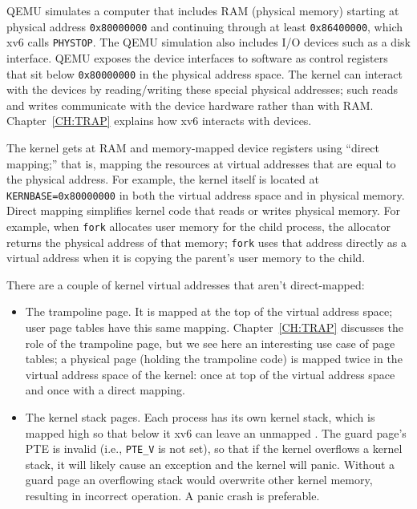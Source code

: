 QEMU simulates a computer that includes RAM (physical memory) starting
at physical address \texttt{0x80000000} and continuing through
at least \texttt{0x86400000}, which xv6 calls \texttt{PHYSTOP}.
The QEMU simulation also
includes I/O devices
such as a disk interface.
QEMU exposes the device interfaces to software as
control registers that sit below
\texttt{0x80000000}
in the physical address space.
The kernel can interact with the devices by reading/writing
these special physical addresses; such reads and writes communicate
with the device hardware rather than with RAM.
Chapter~\ref{CH:TRAP} explains
how xv6 interacts with devices.

The kernel gets at RAM and memory-mapped device registers
using ``direct mapping;'' that is, mapping the resources at
virtual addresses that are equal to the physical address.
For
example, the kernel itself is located at \lstinline{KERNBASE=0x80000000} in both
the virtual address space and in physical memory.
Direct mapping simplifies kernel code that reads or writes
physical memory. For example, when \lstinline{fork}
allocates user memory for the child process,
the allocator returns the physical address of that memory;
\lstinline{fork} uses that address directly as a virtual
address when it is copying the parent's user memory to the child.

There are a couple of kernel virtual
addresses that aren't direct-mapped:

\begin{itemize}
  
\item The trampoline page. It is mapped at the top of the virtual
  address space; user page tables have this same mapping.
  Chapter~\ref{CH:TRAP} discusses the role of the trampoline
  page, but we see here an interesting use case of page tables; a
  physical page (holding the trampoline code) is mapped twice in the
  virtual address space of the kernel: once at top of the virtual
  address space and once with a direct mapping.

\item The kernel stack pages.  Each process has its own kernel stack,
  which is mapped high so that below it xv6 can leave an unmapped .  The guard page's PTE is invalid (i.e.,
  \lstinline{PTE_V} is not set), so that if the kernel overflows
  a kernel stack, it will likely cause an exception and the kernel will panic.
  Without a guard page an overflowing stack would overwrite other kernel memory,
  resulting in incorrect operation. A panic crash is preferable.

\end{itemize}

